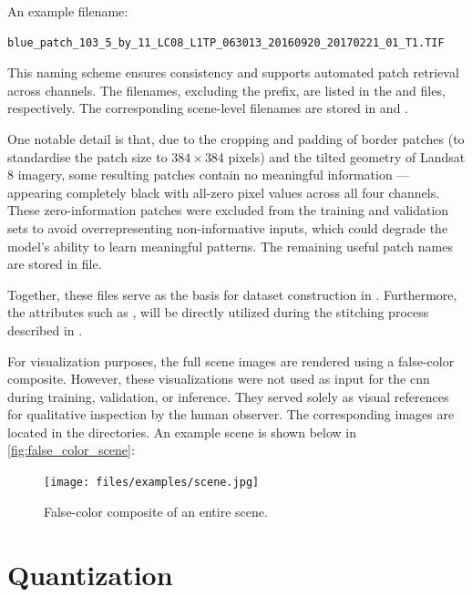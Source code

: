 {An example filename:

\begin{lstlisting}
blue_patch_103_5_by_11_LC08_L1TP_063013_20160920_20170221_01_T1.TIF
\end{lstlisting}

This naming scheme ensures consistency and supports automated patch retrieval across channels.
The filenames, excluding the  prefix, are listed in the  and  files, respectively.
The corresponding scene-level filenames are stored in  and .

One notable detail is that, due to the cropping and padding of border patches (to standardise the patch size to \ensuremath{384\times384} pixels) and the tilted geometry of Landsat 8 imagery,
some resulting patches contain no meaningful information --- appearing completely black with all-zero pixel values across all four channels.
These zero-information patches were excluded from the training and validation sets to avoid overrepresenting non-informative inputs,
which could degrade the model's ability to learn meaningful patterns.
The remaining useful patch names are stored in  file.

Together, these  files serve as the basis for dataset construction in .
Furthermore, the attributes such as ,  will be directly utilized during the stitching process described in .

For visualization purposes, the full scene images are rendered using a false-color composite.
However, these visualizations were not used as input for the \gls{cnn} during training, validation, or inference.
They served solely as visual references for qualitative inspection by the human observer.
The corresponding images are located in the  directories.
An example scene is shown below in \autoref{fig:false_color_scene}: 

\begin{figure}[H]
  \centering
  \texttt{[image: files/examples/scene.jpg]}
  \caption{False-color composite of an entire scene.}
  \label{fig:false_color_scene}
\end{figure}


\section{Quantization}
\label{subsec:quantization}

}
